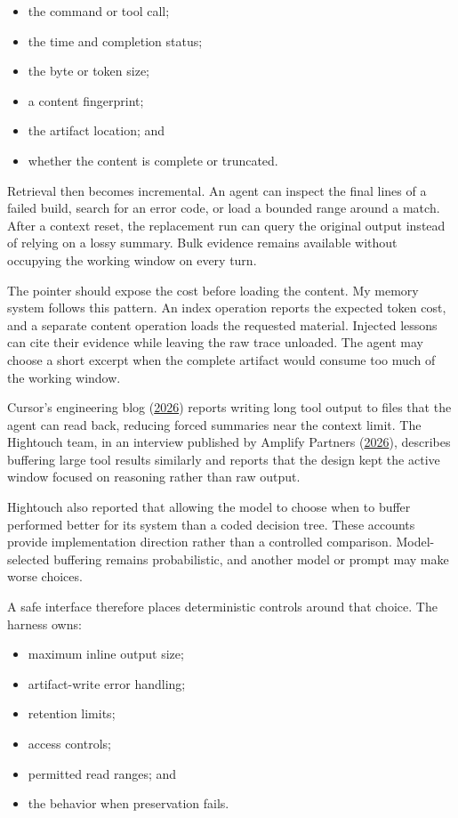 \begin{itemize}
\tightlist
\item
  the command or tool call;
\item
  the time and completion status;
\item
  the byte or token size;
\item
  a content fingerprint;
\item
  the artifact location; and
\item
  whether the content is complete or truncated.
\end{itemize}

Retrieval then becomes incremental. An agent can inspect the final lines of a failed build, search for an error code, or load a bounded range around a match. After a context reset, the replacement run can query the original output instead of relying on a lossy summary. Bulk evidence remains available without occupying the working window on every turn.

The pointer should expose the cost before loading the content. My memory system follows this pattern. An index operation reports the expected token cost, and a separate content operation loads the requested material. Injected lessons can cite their evidence while leaving the raw trace unloaded. The agent may choose a short excerpt when the complete artifact would consume too much of the working window.

Cursor's engineering blog (\href{https://cursor.com/blog/dynamic-context-discovery}{2026}) reports writing long tool output to files that the agent can read back, reducing forced summaries near the context limit. The Hightouch team, in an interview published by Amplify Partners (\href{https://www.amplifypartners.com/blog-posts/how-hightouch-built-their-long-running-agent-harness}{2026}), describes buffering large tool results similarly and reports that the design kept the active window focused on reasoning rather than raw output.

Hightouch also reported that allowing the model to choose when to buffer performed better for its system than a coded decision tree. These accounts provide implementation direction rather than a controlled comparison. Model-selected buffering remains probabilistic, and another model or prompt may make worse choices.

A safe interface therefore places deterministic controls around that choice. The harness owns:

\begin{itemize}
\tightlist
\item
  maximum inline output size;
\item
  artifact-write error handling;
\item
  retention limits;
\item
  access controls;
\item
  permitted read ranges; and
\item
  the behavior when preservation fails.
\end{itemize}

